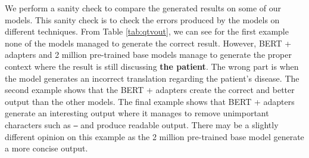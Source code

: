 We perform a sanity check to compare the generated results on some of our models. This sanity check is to check the errors produced by the models on different techniques.
From Table \ref{tab:qtvout}, we can see for the first example none of the models managed to generate the correct result. However, BERT + adapters and 2 million pre-trained base models manage to generate the proper context where the result is still discussing \textbf{the patient}. The wrong part is when the model generates an incorrect translation regarding the patient's disease. The second example shows that the BERT + adapters create the correct and better output than the other models. The final example shows that BERT + adapters generate an interesting output where it manages to remove unimportant characters such as \texttt{--} and produce readable output. There may be a slightly different opinion on this example as the 2 million pre-trained base model generate a more concise output.
